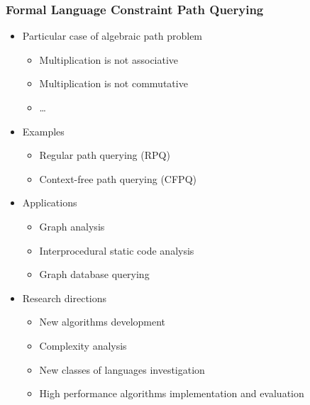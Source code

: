 \documentclass[xcolor=table,aspectratio=169]{beamer}
\begin{document}
\begin{frame}[fragile]
  \frametitle{Formal Language Constraint Path Querying}
    \begin{itemize}
      \item Particular case of algebraic path problem
      \begin{itemize}
        \item Multiplication is not associative
        \item Multiplication is not commutative
        \item \ldots
      \end{itemize}
      \pause
      \item Examples
      \begin {itemize}
        \item Regular path querying (RPQ)
        \item Context-free path querying (CFPQ)
      \end{itemize}
    \pause    
    \item Applications 
    \begin{itemize}
      \item Graph analysis
      \item Interprocedural static code analysis
      \item Graph database querying
    \end{itemize}
    \pause
    \item Research directions
    \begin{itemize}
      \item New algorithms development
      \item Complexity analysis
      \item New classes of languages investigation
      \item High performance algorithms implementation and evaluation 
    \end{itemize}
  \end{itemize}
\end{frame}
\end{document}

